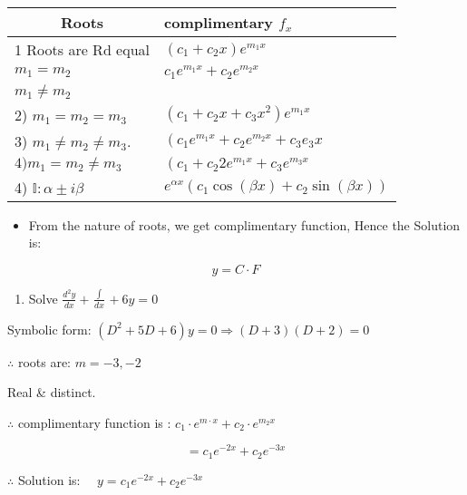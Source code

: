 \documentclass[12pt, a4paper]{article}
\begin{document}
	\begin{center}
		\begin{tabular}{|l|l|}
			\hline
			\multicolumn{1}{|c|}{Roots}         & complimentary $f_{x}$                                              \\
			\hline
			1 Roots are Rd equal                & $\left(c_{1}+c_{2} x\right) e^{m_{1} x}$                           \\
			$m_{1}=m_{2}$                       & $c_{1} e^{m_{1} x}+c_{2} e^{m_{2} x}$                              \\
			$m_{1} \neq m_{2}$                  &                                                                    \\
			2) $m_{1}=m_{2}=m_{3}$              & $\left(c_{1}+c_{2} x+c_{3} x^2 \right) e^{m_{1} x}$                \\
			3) $m_{1} \neq m_{2} \neq m_{3}$.   & $\left(c_{1} e^{m_{1} x}+c_{2} e^{m_{2} x}+c_{3} e_{3} x\right.$   \\
			$4) m_{1}=m_{2} \neq m_{3}$         & $\left(c_{1}+c_{2} 2 e^{m_{1} x}+c_{3} e^{m_{3} x}\right.$         \\
			4) $\mathbb{I}: \alpha \pm i \beta$ & $e^{\alpha x}\left(c_{1} \cos(\beta x)+c_{2} \sin(\beta x)\right)$ \\
			\hline
		\end{tabular}
	\end{center}

	\begin{itemize}
		\item From the nature of roots, we get complimentary function, Hence the Solution is:
	\end{itemize}

$$
y=C \cdot F
$$

	\begin{enumerate}
		\item Solve $\frac{d^{2} y}{d x}+\frac{\int}{d x}+6 y=0$
	\end{enumerate}

	Symbolic form: $\left(D^{2}+5 D+6\right) y=0 \Rightarrow(D+3)(D+2)=0$

	$\therefore$ roots are: $m=-3,-2$

	Real \& distinct.

	$\therefore$ complimentary function is : $c_{1} \cdot e^{m \cdot x}+c_{2} \cdot e^{m_{2} x}$

$$
=c_{1} e^{-2 x}+c_{2} e^{-3 x}
$$

	$\therefore$ Solution is: $\quad y=c_{1} e^{-2 x}+c_{2} e^{-3 x}$
\end{document}
